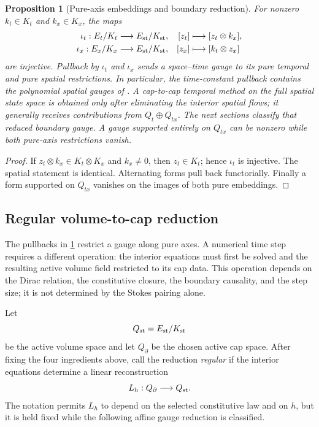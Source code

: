 \documentclass[11pt,a4paper]{article}
\newtheorem{proposition}[theorem]{Proposition}
\begin{document}
\begin{proposition}[Pure-axis embeddings and boundary reduction]
\label{prop:boundary-reductions}
For nonzero \(k_t\in K_t\) and \(k_x\in K_x\), the maps
\begin{align*}
 \iota_t:E_t/K_t&\longrightarrow E_{\rm st}/K_{\rm st},
 &[z_t]&\longmapsto[z_t\otimes k_x],\\
 \iota_x:E_x/K_x&\longrightarrow E_{\rm st}/K_{\rm st},
 &[z_x]&\longmapsto[k_t\otimes z_x]
\end{align*}
are injective.  Pullback by \(\iota_t\) and \(\iota_x\) sends a
space--time gauge to its pure temporal and pure spatial restrictions.  In
particular, the time-constant pullback contains the polynomial spatial
gauges of \cite{moulla2012}.  A cap-to-cap temporal method on the full
spatial state space is obtained only after eliminating the interior
spatial flows; it generally receives contributions from
\(Q_t\oplus Q_{tx}\).  The next sections classify that reduced boundary
gauge.  A gauge supported entirely on \(Q_{tx}\) can be nonzero while both
pure-axis restrictions vanish.
\end{proposition}

\begin{proof}
If \(z_t\otimes k_x\in K_t\otimes K_x\) and \(k_x\ne0\), then
\(z_t\in K_t\); hence \(\iota_t\) is injective.  The spatial statement is
identical.  Alternating forms pull back functorially.  Finally a form
supported on \(Q_{tx}\) vanishes on the images of both pure embeddings.
\end{proof}

\subsection{Regular volume-to-cap reduction}

The pullbacks in \cref{prop:boundary-reductions} restrict a gauge along
pure axes.  A numerical time step requires a different operation: the
interior equations must first be solved and the resulting active volume
field restricted to its cap data.  This operation depends on the Dirac
relation, the constitutive closure, the boundary causality, and the step
size; it is not determined by the Stokes pairing alone.

Let
\[
 Q_{\rm st}=E_{\rm st}/K_{\rm st}
\]
be the active volume space and let \(Q_\partial\) be the chosen active cap
space.  After fixing the four ingredients above, call the reduction
\emph{regular} if the interior equations determine a linear reconstruction
\begin{equation}\label{eq:regular-lifting}
 L_h:Q_\partial\longrightarrow Q_{\rm st}.
\end{equation}
The notation permits \(L_h\) to depend on the selected constitutive law
and on \(h\), but it is held fixed while the following affine gauge
reduction is classified.
\end{document}
